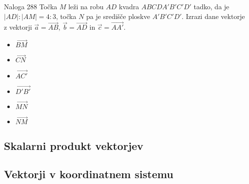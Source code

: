 \begin{frame}
\begin{columns}
            \end{columns}



        \end{frame}

        \begin{frame}
            
            \begin{exampleblock}{Naloga 288}
                Točka $M$ leži na robu $AD$ kvadra $ABCDA'B'C'D'$ tadko, da je $|AD|:|AM|=4:3$, točka $N$ pa je središče ploskve $A'B'C'D'$. Izrazi dane vektorje z vektorji $\vec{a}=\vec{AB}$, $\vec{b}=\vec{AD}$ in $\vec{c}=\vec{AA'}$.
                \begin{itemize}
                    \item<2-> $\vec{BM}$
                    \item<3-> $\vec{CN}$
                    \item<4-> $\vec{AC'}$
                    \item<5-> $\vec{D'B'}$
                    \item<6-> $\vec{MN}$
                    \item<7-> $\vec{NM}$
                \end{itemize}
                
            \end{exampleblock}
        \end{frame}


    \subsection{Skalarni produkt vektorjev}


    \subsection{Vektorji v koordinatnem sistemu}

